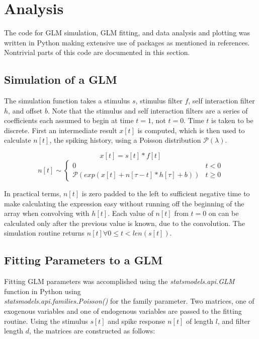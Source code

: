\documentclass[letterpaper,titlepage,10pt]{article}
\begin{document}
\section{Analysis}

The code for GLM simulation, GLM fitting, and data analysis and plotting was written in Python making extensive use
of packages as mentioned in references. Nontrivial parts of this code are documented in this section.

\subsection{Simulation of a GLM}

The simulation function takes a stimulus $s$, stimulus filter $f$, self interaction filter $h$, and offset $b$. Note
that the stimulus and self interaction filters are a series of coefficients each assumed to begin at time $t=1$, not
$t=0$. Time $t$ is taken to be discrete. First an intermediate result $x[t]$ is computed, which is then used to
calculate $n[t]$, the spiking history, using a Poisson distribution $\mathcal{P}(\lambda)$.

$$x[t]=s[t]*f[t]$$
$$n[t]\sim
\begin{cases}
0 & t < 0\\
\mathcal{P}(exp(x[t]+n[\tau-t]*h[\tau]+b)) & t \geq 0
\end{cases}$$

In practical terms, $n[t]$ is zero padded to the left to sufficient negative time to make calculating the expression
easy without running off the beginning of the array when convolving with $h[t]$. Each value of $n[t]$ from $t=0$ on
can be calculated only after the previous value is known, due to the convolution. The simulation routine returns
$n[t] \forall 0 \leq t < len(s[t])$.

\subsection{Fitting Parameters to a GLM}

Fitting GLM parameters was accomplished using the \textit{statsmodels.api.GLM} function in
Python using \\\textit{statsmodels.api.families.Poisson()} for the family parameter. Two
matrices, one of exogenous variables and one of endogenous variables are passed to the fitting routine. Using the
stimulus $s[t]$ and spike response $n[t]$ of length $l$, and filter length $d$, the matrices are constructed as
follows:
\end{document}
